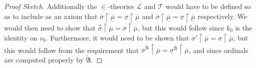 \documentclass{amsart}
\theoremstyle{definition}
\theoremstyle{remark}
\newcommand{\rest}{\mathbin{\upharpoonright}}
\begin{document}
\begin{proof}[Proof Sketch]
Additionally the $\in$-theories $\mathcal L$ and $\mathcal T$ would have to be defined so as to include as an axiom that $\mathring \sigma \rest \overline{\underline{\mu}} = \underline{\sigma} \rest \overline{\underline \mu}$ and $\dot \sigma \rest \overline{\underline{\mu}} = \underline{\sigma} \rest \overline{\underline \mu}$ respectively. 
We would then need to show that $\overset{*}\sigma \rest \overline{\mu} = \sigma \rest \overline{\mu}$, but this would follow since $k_0$ is the identity on $\nu_0$. 
Furthermore, it would need to be shown that $\sigma' \rest \overline{\mu} = \sigma \rest \overline{\mu}$, but this would follow from the requirement that $\dot \sigma^{\tilde{\mathfrak A}} \rest \overline{\mu} = \underline{\sigma}^{\tilde{\mathfrak A}} \rest \overline{\mu}$, and since ordinals are computed properly by $\tilde{\mathfrak A}$. \end{proof}




\end{document}
